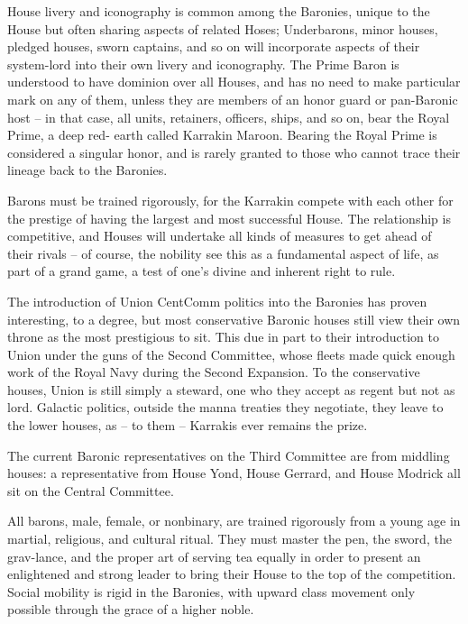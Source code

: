House livery and iconography is common among the Baronies, unique to the House but often
sharing aspects of related Hoses; Underbarons, minor houses, pledged houses, sworn captains,
and so on will incorporate aspects of their system-lord into their own livery and iconography. The
Prime Baron is understood to have dominion over all Houses, and has no need to make
particular mark on any of them, unless they are members of an honor guard or pan-Baronic host
-- in that case, all units, retainers, officers, ships, and so on, bear the Royal Prime, a deep red-
earth called Karrakin Maroon. Bearing the Royal Prime is considered a singular honor, and is
rarely granted to those who cannot trace their lineage back to the Baronies.

Barons must be trained rigorously, for the Karrakin compete with each other for the prestige of
having the largest and most successful House. The relationship is competitive, and Houses will
undertake all kinds of measures to get ahead of their rivals -- of course, the nobility see this as a
fundamental aspect of life, as part of a grand game, a test of one's divine and inherent right to
rule.

The introduction of Union CentComm politics into the Baronies has proven interesting, to a
degree, but most conservative Baronic houses still view their own throne as the most prestigious
to sit. This due in part to their introduction to Union under the guns of the Second Committee,
whose fleets made quick enough work of the Royal Navy during the Second Expansion. To the
conservative houses, Union is still simply a steward, one who they accept as regent but not as
lord. Galactic politics, outside the manna treaties they negotiate, they leave to the lower houses,
as -- to them -- Karrakis ever remains the prize.

The current Baronic representatives on the Third Committee are from middling houses: a
representative from House Yond, House Gerrard, and House Modrick all sit on the Central
Committee.

All barons, male, female, or nonbinary, are trained rigorously from a young age in martial,
religious, and cultural ritual. They must master the pen, the sword, the grav-lance, and the proper
art of serving tea equally in order to present an enlightened and strong leader to bring their
House to the top of the competition. Social mobility is rigid in the Baronies, with upward class
movement only possible through the grace of a higher noble.

